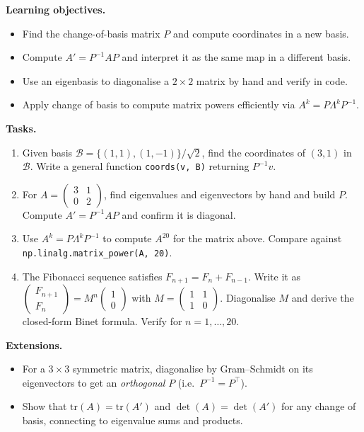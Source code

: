 \documentclass[11pt, a4paper]{article}
\newcommand{\objectives}[1]{%
  \textbf{\color{prereqcolor}Learning objectives.}\vspace{2pt}
  \begin{itemize}[leftmargin=1.6em, itemsep=1pt] #1 \end{itemize}
}
\newcommand{\tasks}[1]{%
  \begin{taskbox}
  \textbf{\color{taskcolor}Tasks.}
  \begin{enumerate}[leftmargin=1.6em, itemsep=3pt] #1 \end{enumerate}
  \end{taskbox}
}
\newcommand{\extensions}[1]{%
  \textbf{\color{notecolor}Extensions.}
  \begin{itemize}[leftmargin=1.6em, itemsep=1pt] #1 \end{itemize}
}
\begin{document}
\objectives{
  \item Find the change-of-basis matrix $P$ and compute coordinates in a new basis.
  \item Compute $A' = P^{-1}AP$ and interpret it as the same map in a different basis.
  \item Use an eigenbasis to diagonalise a $2\times 2$ matrix by hand and verify in code.
  \item Apply change of basis to compute matrix powers efficiently via $A^k = P\Lambda^k P^{-1}$.
}

\tasks{
  \item Given basis $\mathcal{B} = \{(1,1),(1,-1)\}/\sqrt{2}$, find the coordinates
        of $(3,1)$ in $\mathcal{B}$.  Write a general function \texttt{coords(v, B)}
        returning $P^{-1}v$.
  \item For $A = \begin{pmatrix}3&1\\0&2\end{pmatrix}$, find eigenvalues and eigenvectors
        by hand and build $P$.  Compute $A' = P^{-1}AP$ and confirm it is diagonal.
  \item Use $A^k = P\Lambda^k P^{-1}$ to compute $A^{20}$ for the matrix above.
        Compare against \texttt{np.linalg.matrix\_power(A, 20)}.
  \item The Fibonacci sequence satisfies $F_{n+1} = F_n + F_{n-1}$.
        Write it as $\begin{pmatrix}F_{n+1}\\F_n\end{pmatrix}
        = M^n \begin{pmatrix}1\\0\end{pmatrix}$ with $M = \begin{pmatrix}1&1\\1&0\end{pmatrix}$.
        Diagonalise $M$ and derive the closed-form Binet formula.
        Verify for $n = 1, \ldots, 20$.
}

\extensions{
  \item For a $3\times 3$ symmetric matrix, diagonalise by Gram--Schmidt on its
        eigenvectors to get an \emph{orthogonal} $P$ (i.e.\ $P^{-1}=P^\top$).
  \item Show that $\mathrm{tr}(A) = \mathrm{tr}(A')$ and $\det(A) = \det(A')$
        for any change of basis, connecting to eigenvalue sums and products.
}

\end{document}
